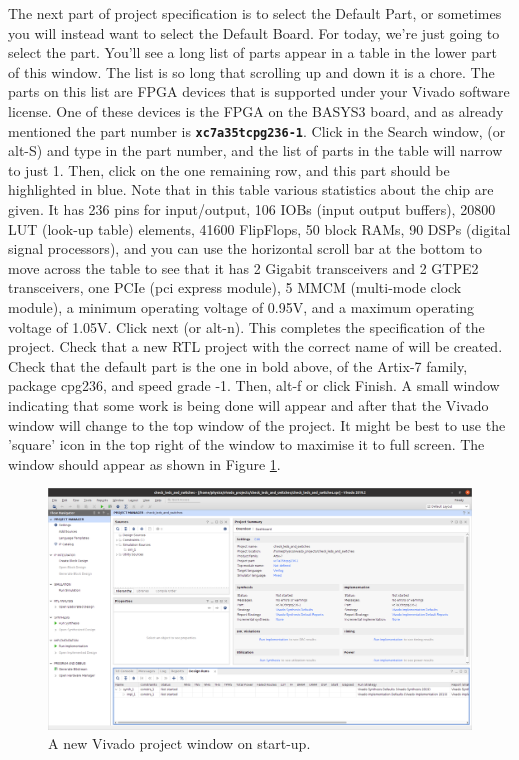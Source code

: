 \documentclass[../physical_computing.tex]{subfiles}
\begin{document}
The next part of project specification is to select the Default Part, or sometimes you will instead want to select the Default Board. For today, we're just going to select the part. You'll see a long list of parts appear in a table in the lower part of this window. The list is so long that scrolling up and down it is a chore. The parts on this list are FPGA devices that is supported under your Vivado software license. One of these devices is the FPGA on the BASYS3 board, and as already mentioned the part number is \texttt{\bf xc7a35tcpg236-1}. Click in the Search window, (or alt-S) and type in the part number, and the list of parts in the table will narrow to just 1. Then, click on the one remaining row, and this part should be highlighted in blue. Note that in this table various statistics about the chip are given. It has 236 pins for input/output, 106 IOBs (input output buffers), 20800 LUT (look-up table) elements, 41600 FlipFlops, 50 block RAMs, 90 DSPs (digital signal processors), and you can use the horizontal scroll bar at the bottom to move across the table to see that it has 2 Gigabit transceivers and 2 GTPE2 transceivers, one PCIe (pci express module), 5 MMCM (multi-mode clock module), a minimum operating voltage of 0.95V, and a maximum operating voltage of 1.05V. Click next (or alt-n). This completes the specification of the project. Check that a new RTL project with the correct name of  will be created. Check that the default part is the one in bold above, of the Artix-7 family, package cpg236, and speed grade -1. Then, alt-f or click Finish. A small window indicating that some work is being done will appear and after that the Vivado window will change to the top window of the project. It might be best to use the 'square' icon in the top right of the window to maximise it to full screen. The window should appear as shown in Figure \ref{fig:vivado_project}.

\begin{figure}
    \centering
    \includegraphics[width=\textwidth]{figures/create_new_vivado_project.png}
    \caption{A new Vivado project window on start-up.}
    \label{fig:vivado_project}
\end{figure}
\end{document}
